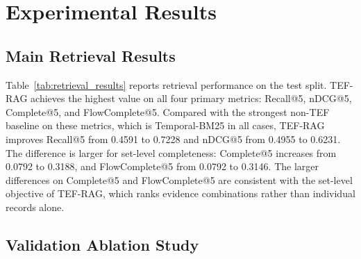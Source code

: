 \section{Experimental Results}
\label{sec:results}

\subsection{Main Retrieval Results}

Table~\ref{tab:retrieval_results} reports retrieval performance on the test split.
TEF-RAG achieves the highest value on all four primary metrics: Recall@5, nDCG@5, Complete@5, and FlowComplete@5.
Compared with the strongest non-TEF baseline on these metrics, which is Temporal-BM25 in all cases,
TEF-RAG improves Recall@5 from 0.4591 to 0.7228 and nDCG@5 from 0.4955 to 0.6231.
The difference is larger for set-level completeness: Complete@5 increases from 0.0792 to 0.3188, and FlowComplete@5 from 0.0792 to 0.3146.
The larger differences on Complete@5 and FlowComplete@5 are consistent with the set-level objective of TEF-RAG, which ranks evidence combinations rather than individual records alone.

\begin{table}[t]
\caption{Main retrieval results on the test split (Top-5).}
\label{tab:retrieval_results}
\centering
\small
\setlength{\tabcolsep}{3pt}
\end{table}

\subsection{Validation Ablation Study}
\label{sec:ablation_results}

